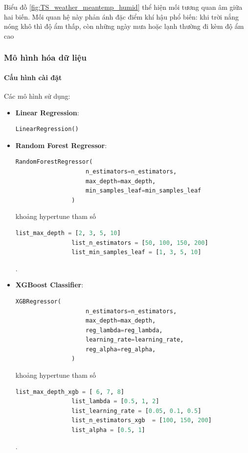     Biểu đồ \ref{fig:TS_weather_meantemp_humid} thể hiện mối tương quan âm giữa hai biến. Mối quan hệ này phản ánh đặc điểm khí hậu phổ biến: khi trời nắng nóng khô thì độ ẩm thấp, còn những ngày mưa hoặc lạnh thường đi kèm độ ẩm cao

\subsubsection{Mô hình hóa dữ liệu}
    \paragraph{Cấu hình cài đặt} 
    \leavevmode

    Các mô hình sử dụng:

    \begin{itemize}
        \item \textbf{Linear Regression}: 

            \begin{lstlisting}[language=Python]
                LinearRegression()
            \end{lstlisting}

        \item \textbf{Random Forest Regressor}:

            \begin{lstlisting}[language=Python]
                RandomForestRegressor(
                    n_estimators=n_estimators, 
                    max_depth=max_depth, 
                    min_samples_leaf=min_samples_leaf
                )
            \end{lstlisting}

            khoảng hypertune tham số

            \begin{lstlisting}[language=Python]
                list_max_depth = [2, 3, 5, 10]
                list_n_estimators = [50, 100, 150, 200]
                list_min_samples_leaf = [1, 3, 5, 10]
            \end{lstlisting}.

        \item \textbf{XGBoost Classifier}:
            \begin{lstlisting}[language=Python]
                XGBRegressor(
                    n_estimators=n_estimators, 
                    max_depth=max_depth, 
                    reg_lambda=reg_lambda,
                    learning_rate=learning_rate,
                    reg_alpha=reg_alpha,
                )
            \end{lstlisting}

            khoảng hypertune tham số

            \begin{lstlisting}[language=Python]
                list_max_depth_xgb = [ 6, 7, 8]
                list_lambda = [0.5, 1, 2]
                list_learning_rate = [0.05, 0.1, 0.5]
                list_n_estimators_xgb  = [100, 150, 200]
                list_alpha = [0.5, 1]
            \end{lstlisting}.
        
    \end{itemize}

